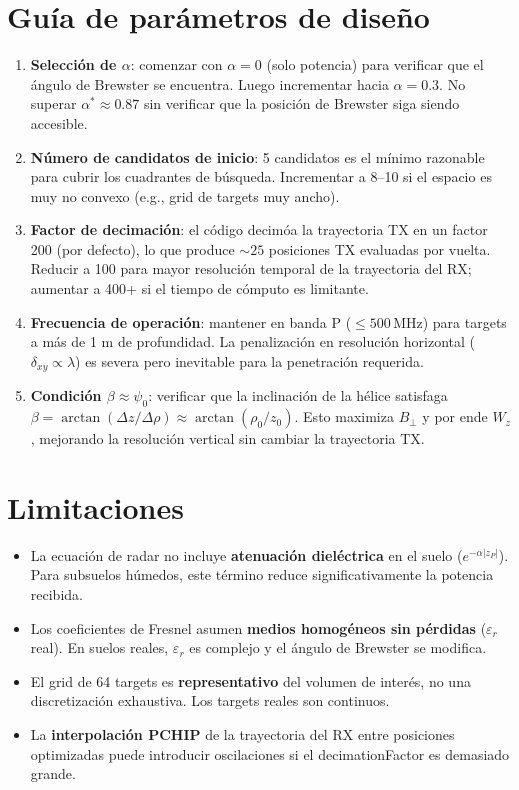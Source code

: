\documentclass[12pt,a4paper,oneside]{book}
\newcommand{\alphaR}{\alpha}
\newcommand{\dxy}{\delta_{xy}}
\begin{document}
\section{Guía de parámetros de diseño}

\begin{enumerate}
  \item \textbf{Selección de $\alphaR$}: comenzar con $\alphaR=0$ (solo potencia) para verificar que el ángulo de Brewster se encuentra. Luego incrementar hacia $\alphaR=0.3$. No superar $\alphaR^*\approx 0.87$ sin verificar que la posición de Brewster siga siendo accesible.

  \item \textbf{Número de candidatos de inicio}: 5 candidatos es el mínimo razonable para cubrir los cuadrantes de búsqueda. Incrementar a 8--10 si el espacio es muy no convexo (e.g., grid de targets muy ancho).

  \item \textbf{Factor de decimación}: el código decimóa la trayectoria TX en un factor 200 (por defecto), lo que produce $\sim\!25$ posiciones TX evaluadas por vuelta. Reducir a 100 para mayor resolución temporal de la trayectoria del RX; aumentar a 400+ si el tiempo de cómputo es limitante.

  \item \textbf{Frecuencia de operación}: mantener en banda P ($\leq 500\,\text{MHz}$) para targets a más de 1 m de profundidad. La penalización en resolución horizontal ($\dxy\propto\lambda$) es severa pero inevitable para la penetración requerida.

  \item \textbf{Condición $\beta\approx\psi_0$}: verificar que la inclinación de la hélice satisfaga $\beta = \arctan(\Delta z/\Delta\rho) \approx \arctan(\rho_0/z_0)$. Esto maximiza $B_\perp$ y por ende $W_z$, mejorando la resolución vertical sin cambiar la trayectoria TX.
\end{enumerate}

\section{Limitaciones}

\begin{itemize}
  \item La ecuación de radar no incluye \textbf{atenuación dieléctrica} en el suelo ($e^{-\alpha|z_P|}$). Para subsuelos húmedos, este término reduce significativamente la potencia recibida.
  \item Los coeficientes de Fresnel asumen \textbf{medios homogéneos sin pérdidas} ($\varepsilon_r$ real). En suelos reales, $\varepsilon_r$ es complejo y el ángulo de Brewster se modifica.
  \item El grid de 64 targets es \textbf{representativo} del volumen de interés, no una discre\-tización exhaustiva. Los targets reales son continuos.
  \item La \textbf{interpolación PCHIP} de la trayectoria del RX entre posiciones optimizadas puede introducir oscilaciones si el decimationFactor es demasiado grande.
\end{itemize}
\end{document}
